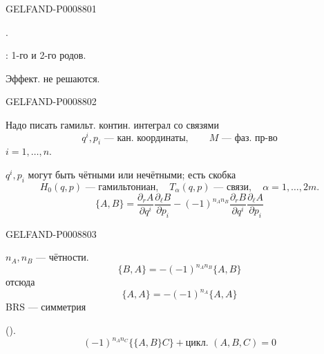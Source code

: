 \begin{GelfandAdjacentEvidence}{GELFAND-P000880}{1}

.

: 1-го и 2-го родов.

Эффект. не решаются.
\end{GelfandAdjacentEvidence}
\begin{GelfandAdjacentEvidence}{GELFAND-P000880}{2}


Надо писать гамильт. контин. интеграл со связями
\begin{equation*}
q^i,p_i\text{ --- кан. координаты},\qquad M\text{ --- фаз. пр-во}
\tag{1}
\end{equation*}
$i=1,\ldots,n$.

$q^i,p_i$ могут быть чётными или нечётными; есть скобка
\begin{equation*}
H_0(q,p)\text{ --- гамильтониан},\quad T_\alpha(q,p)\text{ --- связи},\quad
\alpha=1,\ldots,2m.
\tag{2}
\end{equation*}
\begin{equation*}
\{A,B\}=\frac{\partial_r A}{\partial q^i}\frac{\partial_\ell B}{\partial p_i}
-(-1)^{n_A n_B}\frac{\partial_r B}{\partial q^i}\frac{\partial_\ell A}{\partial p_i}
\tag{3}
\end{equation*}
\end{GelfandAdjacentEvidence}
\begin{GelfandAdjacentEvidence}{GELFAND-P000880}{3}


$n_A,n_B$ --- чётности.
\begin{equation*}
\{B,A\}=-(-1)^{n_A n_B}\{A,B\}
\tag{4}
\end{equation*}
отсюда
\begin{equation*}
\{A,A\}=-(-1)^{n_A}\{A,A\}
\tag{5}
\end{equation*}
BRS --- симметрия

().
\begin{equation*}
(-1)^{n_A n_C}\{\{A,B\}C\}+\text{цикл. }(A,B,C)=0
\tag{6}
\end{equation*}
\end{GelfandAdjacentEvidence}
